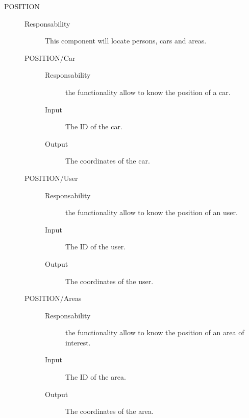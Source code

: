 \documentclass[11pt]{article} %
\begin{document}
\begin{description}
	\item[POSITION] \hfill
	\begin{description}
		\item[Responsability] This component will locate persons, cars and areas.
	\item[POSITION/Car] \hfill
		\begin{description}
			\item[Responsability] the functionality allow to know the position of a car.
			\item[Input] The ID of the car.
			\item[Output] The coordinates of the car.
		\end{description}
	\item[POSITION/User] \hfill
		\begin{description}
			\item[Responsability] the functionality allow to know the position of an user.
			\item[Input] The ID of the user.
			\item[Output] The coordinates of the user.
		\end{description}
	\item[POSITION/Areas] \hfill
		\begin{description}
			\item[Responsability] the functionality allow to know the position of an area of interest.
			\item[Input] The ID of the area.
			\item[Output] The coordinates of the area.
		\end{description}
	\end{description}


\end{description}
\end{document}
